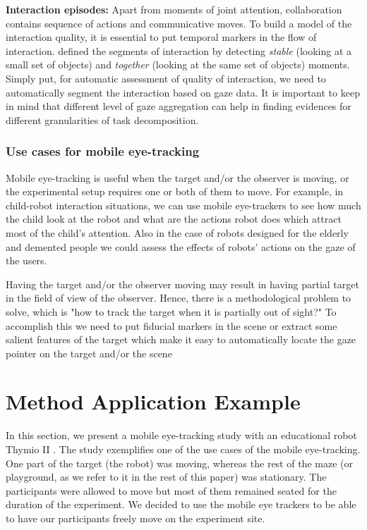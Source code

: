 \documentclass{sig-alternate}
\begin{document}
 \textbf {Interaction episodes:} Apart from moments of joint attention, collaboration contains sequence of actions and communicative moves. To build a model of the interaction quality, it is essential to put temporal markers in the flow of interaction. \cite{sharma2012gaze} defined the segments of interaction by detecting \emph{stable} (looking at a small set of objects) and \emph{together} (looking at the same set of objects) moments. Simply put, for automatic assessment of quality of interaction, we need to automatically segment the interaction based on gaze data. It is important to keep in mind that different level of gaze aggregation can help in finding evidences for different granularities of task decomposition.



\subsubsection{Use cases for mobile eye-tracking} 

Mobile eye-tracking is  useful when the target and/or the observer is moving, or the experimental setup requires one or both of them to move. For example, in child-robot interaction situations, we can use mobile eye-trackers to see how much the child look at the robot and what are the actions robot does which attract most of the child's attention. Also in the case of robots designed for the elderly and demented people we could assess the effects of robots' actions on the gaze of the users.

Having the target and/or the  observer moving may result in having partial target in the field of view of the observer. Hence, there is a methodological problem to solve, which is "how to track the target when it is partially out of sight?" To accomplish this we need to put fiducial markers in the scene or extract some salient features of the target which make it easy to automatically locate the gaze pointer on the target and/or the scene


\section{Method Application Example}
\label{application}

In this section, we present a mobile eye-tracking study with an educational robot Thymio II \cite{riedo2012two}. The study exemplifies one of the use cases of the mobile eye-tracking. One part of the target (the robot) was moving, whereas the rest of the maze (or playground, as we refer to it in the rest of this paper) was stationary. The participants were allowed to move but most of them remained seated for the duration of the experiment.  We decided to use the mobile eye trackers to be able to have our participants freely move on the experiment site. 
\end{document}
